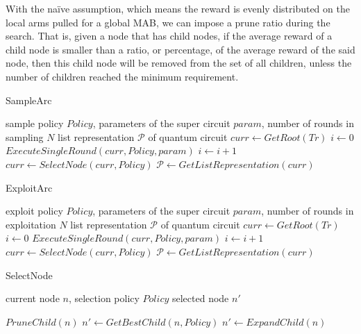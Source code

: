 \documentclass{ieeeaccess}
\begin{document}
With the na\"ive assumption, which means the reward is evenly distributed on the local arms pulled for a global MAB, we can impose a prune ratio during the search. That is, given a node that has child nodes, if the average reward of a child node is smaller than a ratio, or percentage, of the average reward of the said node, then this child node will be removed from the set of all children, unless the number of children reached the minimum requirement.

\begin{algorithm}
\caption{SampleArc}\label{alg:sampleArc}
\begin{algorithmic}
\Require sample policy $Policy$, parameters of the super circuit $param$, number of rounds in sampling $N$
\Ensure list representation $\mathcal{P}$ of quantum circuit
\State $curr \gets GetRoot(Tr)$ 
\State $i\gets0$ 
\State $ExecuteSingleRound(curr, Policy, param)$
\State $i\gets i+1$
\EndWhile
{}
\State $curr\gets SelectNode(curr, Policy)$
\EndWhile
\State $\mathcal{P}\gets GetListRepresentation(curr)$
\end{algorithmic}
\end{algorithm}

\begin{algorithm}[H]
\caption{ExploitArc}\label{alg:exploitArc}
\begin{algorithmic}
\Require exploit policy $Policy$, parameters of the super circuit $param$, number of rounds in exploitation $N$
\Ensure list representation $\mathcal{P}$ of quantum circuit
\State $curr \gets GetRoot(Tr)$ 
\State $i\gets0$ 
\State $ExecuteSingleRound(curr, Policy, param)$
\State $i\gets i+1$
\EndWhile
\State $curr\gets SelectNode(curr, Policy)$
\EndWhile
\State $\mathcal{P}\gets GetListRepresentation(curr)$
\end{algorithmic}
\end{algorithm}

\begin{algorithm}
\caption{SelectNode}\label{alg:selectChild}
\begin{algorithmic}
\Require current node $n$, selection policy $Policy$
\Ensure selected node $n'$

    \State $PruneChild(n)$ 
    \State $n' \gets GetBestChild(n, Policy)$  
\Else
    \State $n' \gets ExpandChild(n)$ 
\EndIf
\end{algorithmic}
\end{algorithm}
\end{document}
